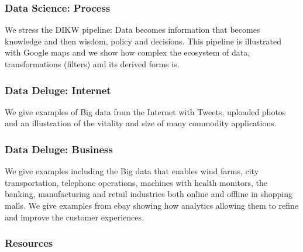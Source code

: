 
\subsubsection{Data Science: Process}\label{data-science-process}

We stress the DIKW pipeline: Data becomes information that becomes
knowledge and then wisdom, policy and decisions. This pipeline is
illustrated with Google maps and we show how complex the ecosystem of
data, transformations (filters) and its derived forms is.



\subsubsection{Data Deluge: Internet}\label{data-deluge-internet}

We give examples of Big data from the Internet with Tweets, uploaded
photos and an illustration of the vitality and size of many commodity
applications.



\subsubsection{Data Deluge: Business}\label{data-deluge-business}

We give examples including the Big data that enables wind farms, city
transportation, telephone operations, machines with health monitors, the
banking, manufacturing and retail industries both online and offline in
shopping malls. We give examples from ebay showing how analytics
allowing them to refine and improve the customer experiences.





\subsubsection{Resources}\label{resources}

